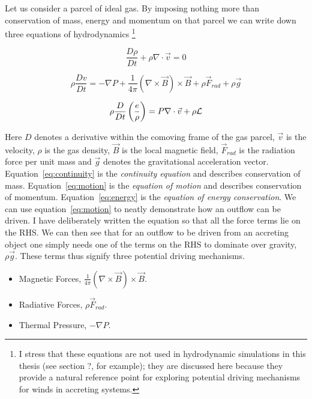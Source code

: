 Let us consider a parcel of ideal gas. By imposing nothing more than
conservation of mass, energy and momentum on that parcel we can write down
three equations of hydrodynamics
\footnote{I stress that these equations are not used in hydrodynamic
simulations in this thesis (see section ?, for example); 
they are discussed here because they provide a natural reference point
for exploring potential driving mechanisms for winds in accreting systems.
}

\begin{equation}
\label{eq:continuity}
\frac{D \rho}{Dt} + \rho \nabla \cdot \vec{v} = 0
\end{equation}

\begin{equation}
\label{eq:motion}
\rho \frac{Dv}{Dt} = -\nabla P + \frac{1}{4 \pi}(\nabla \times \vec{B}) \times \vec{B} + \rho \vec{F}_{rad} + \rho \vec{g}
\end{equation}

\begin{equation}
\label{eq:energy}
\rho \frac{D}{Dt} \left(\frac{e}{\rho}\right) = P \nabla \cdot \vec{v} + \rho \cal{L}
\end{equation}

Here $D$ denotes a derivative within the comoving frame of the gas parcel, $\vec{v}$ is the velocity,
$\rho$ is the gas density, $\vec{B}$ is the local magnetic field, $\vec{F}_{rad}$ is the radiation
force per unit mass and $\vec{g}$ denotes the gravitational acceleration vector.
Equation~\ref{eq:continuity} is the {\em continuity equation} and describes conservation of mass. 
Equation~\ref{eq:motion} is the {\em equation of motion} and describes conservation of momentum.
Equation~\ref{eq:energy} is the {\em equation of energy conservation}. 
We can use equation~\ref{eq:motion} to neatly demonstrate how an outflow can be driven. I have 
deliberately written the equation so that all the force terms lie on the RHS. We can then see that
for an outflow to be driven from an accreting object one simply needs one of the terms on
the RHS to dominate over gravity, $\rho \vec{g}$. These terms thus signify three potential
driving mechanisms.

\begin{itemize}
	\item Magnetic Forces, $\frac{1}{4 \pi}(\nabla \times \vec{B}) \times \vec{B}$.
	\item Radiative Forces, $\rho \vec{F}_{rad}$.
	\item Thermal Pressure, $-\nabla P$.
\end{itemize}

